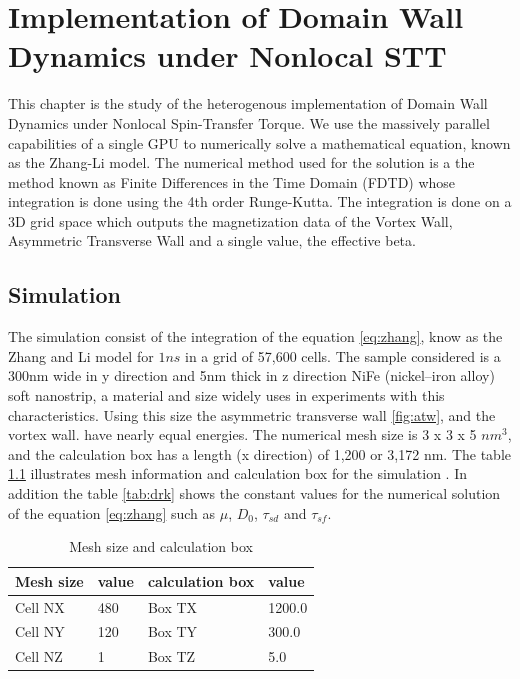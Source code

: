 
\chapter{Implementation of Domain Wall Dynamics under Nonlocal STT} %

\label{Implementation of Domain Wall Dynamics under Nonlocal STT} %


This chapter is the study of the heterogenous implementation of Domain Wall Dynamics under Nonlocal Spin-Transfer Torque. We use the massively parallel capabilities of a single GPU to numerically solve a mathematical equation, known as the Zhang-Li model. The numerical method used for the solution is a the method known as Finite Differences in the Time Domain (FDTD) whose integration is done using the 4th order Runge-Kutta. The integration is done on a 3D grid space which outputs the magnetization data of the Vortex Wall, Asymmetric Transverse Wall and a single value, the effective beta.

\section{Simulation}

The simulation consist of the integration of the equation \ref{eq:zhang}, know as the Zhang and Li model for $1ns$ in a grid of 57,600 cells. The sample considered is a 300nm wide in y direction and 5nm thick in z direction NiFe (nickel–iron alloy) soft nanostrip, a material and size widely uses in experiments with this characteristics. Using this size the asymmetric transverse wall \ref{fig:atw}, and the vortex wall. have nearly equal energies. The numerical mesh size is 3 x 3 x 5 $nm^3$, and the calculation box has a length (x direction) of 1,200 or 3,172 nm. The table \ref{tab:mesh} illustrates mesh information and calculation box for the simulation \cite{claudio}. In addition the table \ref{tab:drk} shows the constant values for the numerical solution of the equation \ref{eq:zhang} such as $\mu$, $D_{0}$, $\tau_{sd}$ and $\tau_{sf}$.

\begin{table}[h]
\centering
\begin{tabular}{| l | l | l | l |}
\hline
Mesh size & value & calculation box & value \\
\hline
Cell NX & 480 & Box TX  & 1200.0   \\
\hline
Cell NY & 120 & Box TY  & 300.0  \\
\hline
Cell NZ &	1 & Box TZ  & 5.0   \\
\hline
\end{tabular}
\caption{Mesh size and calculation box}
\label{tab:mesh}
\end{table}

